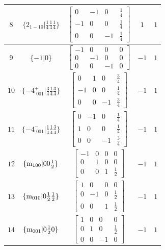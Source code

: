 \documentclass[fleqn,8pt]{jsarticle}
\begin{document}
\begin{longtable}{ccccc}
$ 8 $ & $ \{2{}_{1-10}|\frac{1}{4} \frac{1}{4} \frac{1}{4}\} $ & $ \begin{bmatrix} 0 & -1 & 0 & \frac{1}{4} \\ -1 & 0 & 0 & \frac{1}{4} \\ 0 & 0 & -1 & \frac{1}{4} \end{bmatrix} $ & $ 1 $ & $ 1 $ \\ \hline
$ 9 $ & $ \{-1|0\} $ & $ \begin{bmatrix} -1 & 0 & 0 & 0 \\ 0 & -1 & 0 & 0 \\ 0 & 0 & -1 & 0 \end{bmatrix} $ & $ -1 $ & $ 1 $ \\ \hline
$ 10 $ & $ \{-4^{+}_{\,\,001}|\frac{3}{4} \frac{1}{4} \frac{3}{4}\} $ & $ \begin{bmatrix} 0 & 1 & 0 & \frac{3}{4} \\ -1 & 0 & 0 & \frac{1}{4} \\ 0 & 0 & -1 & \frac{3}{4} \end{bmatrix} $ & $ -1 $ & $ 1 $ \\ \hline
$ 11 $ & $ \{-4^{-}_{\,\,001}|\frac{1}{4} \frac{1}{4} \frac{3}{4}\} $ & $ \begin{bmatrix} 0 & -1 & 0 & \frac{1}{4} \\ 1 & 0 & 0 & \frac{1}{4} \\ 0 & 0 & -1 & \frac{3}{4} \end{bmatrix} $ & $ -1 $ & $ 1 $ \\ \hline
$ 12 $ & $ \{{\rm m}_{100}|0 0 \frac{1}{2}\} $ & $ \begin{bmatrix} -1 & 0 & 0 & 0 \\ 0 & 1 & 0 & 0 \\ 0 & 0 & 1 & \frac{1}{2} \end{bmatrix} $ & $ -1 $ & $ 1 $ \\ \hline
$ 13 $ & $ \{{\rm m}_{010}|0 \frac{1}{2} \frac{1}{2}\} $ & $ \begin{bmatrix} 1 & 0 & 0 & 0 \\ 0 & -1 & 0 & \frac{1}{2} \\ 0 & 0 & 1 & \frac{1}{2} \end{bmatrix} $ & $ -1 $ & $ 1 $ \\ \hline
$ 14 $ & $ \{{\rm m}_{001}|0 \frac{1}{2} 0\} $ & $ \begin{bmatrix} 1 & 0 & 0 & 0 \\ 0 & 1 & 0 & \frac{1}{2} \\ 0 & 0 & -1 & 0 \end{bmatrix} $ & $ -1 $ & $ 1 $ \\ \hline

\end{longtable}
\end{document}
